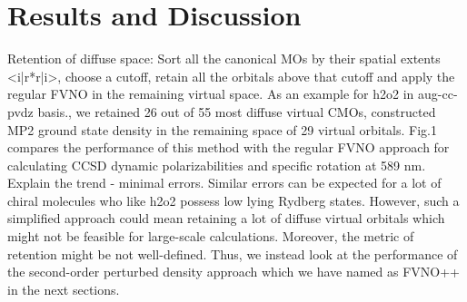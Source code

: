 %
\section{Results and Discussion}
Retention of diffuse space: Sort all the canonical MOs by their spatial
extents <i|r*r|i>, choose a cutoff, retain all the orbitals above that cutoff
and apply the regular FVNO in the remaining virtual space. As an example
for h2o2 in aug-cc-pvdz basis., we retained 26 out of 55 most diffuse virtual 
CMOs, constructed MP2 ground state density in the remaining space of 
29 virtual orbitals. Fig.1 compares the performance of this method 
with the regular FVNO approach for calculating CCSD dynamic polarizabilities
and specific rotation at 589 nm. Explain the trend - minimal errors. Similar
errors can be expected for a lot of chiral molecules who like h2o2 possess 
low lying Rydberg states. However, such a simplified approach could mean 
retaining a lot of diffuse virtual orbitals which might not be feasible 
for large-scale calculations. Moreover, the metric of retention might
be not well-defined. Thus, we instead look at the performance
of the second-order perturbed density approach which we have named as FVNO++ 
in the next sections.
